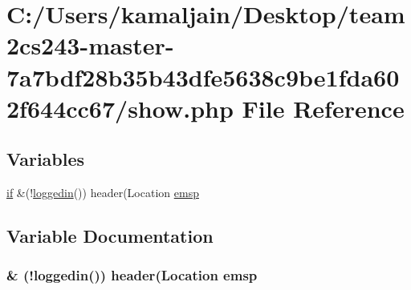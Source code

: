 \hypertarget{show_8php}{}\section{C\+:/\+Users/kamaljain/\+Desktop/team2cs243-\/master-\/7a7bdf28b35b43dfe5638c9be1fda602f644cc67/show.php File Reference}
\label{show_8php}
\subsection*{Variables}
\begin{DoxyCompactItemize}
\item 
\hyperlink{login_8php_a6cf3ef86567b2d2e235730bbe61cb311}{if} \&(!\hyperlink{core_8php_aab6c166eb2634a4ddbacc2f19417fe5c}{loggedin}()) header(\textquotesingle{}Location \hyperlink{show_8php_afa30d5bb1e7774ef5f682c4949a11548}{emsp}
\end{DoxyCompactItemize}


\subsection{Variable Documentation}
\subsubsection[{\texorpdfstring{emsp}{emsp}}]{\& (!{\bf loggedin}()) header(\textquotesingle{}Location emsp}\hypertarget{show_8php_afa30d5bb1e7774ef5f682c4949a11548}{}\label{show_8php_afa30d5bb1e7774ef5f682c4949a11548}
